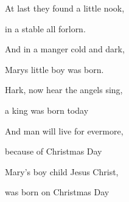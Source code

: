 \documentclass[11pt]{beamer}
\begin{document}
\begin{frame}
At last they found a little nook,

in a stable all forlorn.

And in a manger cold and dark,

Marys little boy was born.
\end{frame}

\begin{frame}
Hark, now hear the angels sing,

a king was born today

And man will live for evermore,

because of Christmas Day

Mary's boy child Jesus Christ,

was born on Christmas Day
\end{frame}

\toc
\end{document}
